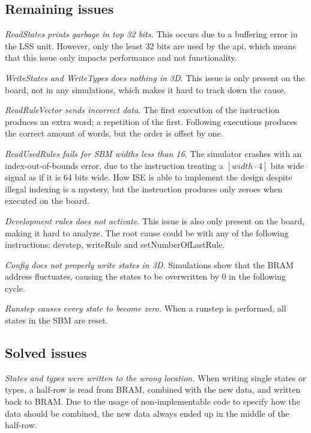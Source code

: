 \subsection{Remaining issues}
\label{sec:remaining-issues}

\emph{ReadStates prints garbage in top 32 bits.}
This occurs due to a buffering error in the LSS unit.
However, only the least 32 bits are used by the api, which means that this issue only impacts performance and not functionality.

\emph{WriteStates and WriteTypes does nothing in 3D.}
This issue is only present on the board, not in any simulations, which makes it hard to track down the cause.

\emph{ReadRuleVector sends incorrect data.}
The first execution of the instruction produces an extra word; a repetition of the first.
Following executions produces the correct amount of words, but the order is offset by one.

\emph{ReadUsedRules fails for SBM widths less than 16.}
The simulator crashes with an index-out-of-bounds error, due to the instruction treating a $[width\cdot4]$ bits wide signal as if it is 64 bits wide.
How ISE is able to implement the design despite illegal indexing is a mystery, but the instruction produces only zeroes when executed on the board.

\emph{Development rules does not activate.}
This issue is also only present on the board, making it hard to analyze.
The root cause could be with any of the following instructions: devstep, writeRule and setNumberOfLastRule.

\emph{Config does not properly write states in 3D.}
Simulations show that the BRAM address fluctuates, causing the states to be overwritten by 0 in the following cycle.

\emph{Runstep causes every state to become zero.}
When a runstep is performed, all states in the SBM are reset.

\subsection{Solved issues}
\label{sec:solved-issues}

\emph{States and types were written to the wrong location.}
When writing single states or types, a half-row is read from BRAM, combined with the new data, and written back to BRAM.
Due to the usage of non-implementable code to specify how the data should be combined, the new data always ended up in the middle of the half-row.

